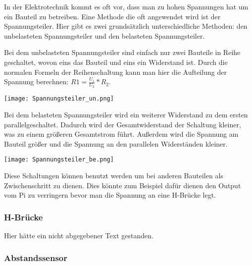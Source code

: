 \documentclass[notitlepage]{report}
\begin{document}
In der Elektrotechnik kommt es oft vor, dass man zu hohen Spannungen hat um ein Bauteil zu betreiben. Eine Methode die oft angewendet wird ist der Spannungsteiler. Hier gibt es zwei grunds\"{a}tzlich unterschiedliche Methoden: den unbelasteten Spannungsteiler und den belasteten Spannungsteiler. 

Bei dem unbelasteten Spannungsteiler sind einfach nur zwei Bauteile in Reihe geschaltet, wovon eins das Bauteil und eins ein Widerstand ist. Durch die normalen Formeln der Reihenschaltung kann man hier die Aufteilung der Spannung berechnen: $R1 = \frac{U_1}{U_2} * R_2$. 

\texttt{[image: Spannungsteiler\_un.png]}

Bei dem belasteten Spannungsteiler wird ein weiterer Widerstand zu dem ersten parallelgeschaltet. Dadurch wird der Gesamtwiderstand der Schaltung kleiner, was zu einem gr\"{o}{\ss}eren Gesamtstrom f\"{u}hrt. Au{\ss}erdem wird die Spannung am Bauteil gr\"{o}{\ss}er und die Spannung an den parallelen Widerst\"{a}nden kleiner. 

\texttt{[image: Spannungsteiler\_be.png]}

Diese Schaltungen k\"{o}nnen benutzt werden um bei anderen Bauteilen als Zwischenschritt zu dienen. Dies k\"{o}nnte zum Beispiel daf\"{u}r dienen den Output vom Pi zu verringern bevor man die Spannung an eine H-Br\"{u}cke legt. 

\subsubsection{H-Br\"{u}cke}

Hier h\"{a}tte ein nicht abgegebener Text gestanden.

\subsubsection{Abstandssensor}
\end{document}
